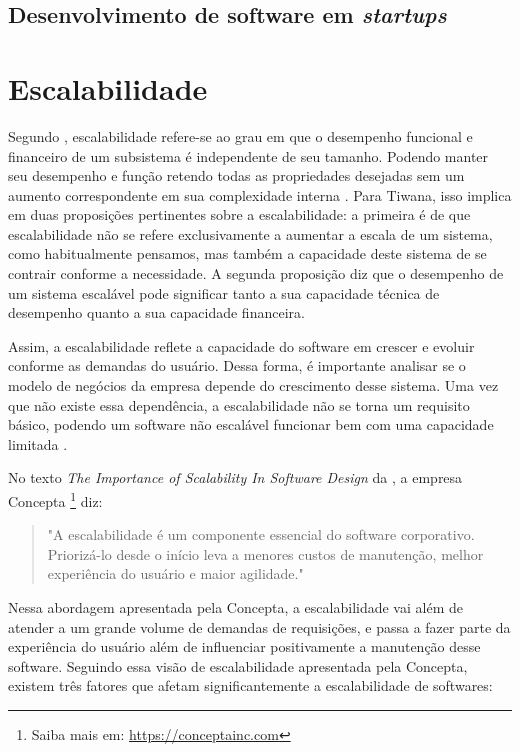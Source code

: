 \subsection{Desenvolvimento de software em \textit{startups}}

\section{Escalabilidade}

Segundo , escalabilidade refere-se ao grau em que
o desempenho funcional e financeiro de um subsistema é independente de seu tamanho.
Podendo manter seu desempenho e função retendo todas as propriedades desejadas sem
um aumento correspondente em sua complexidade interna
. Para Tiwana, isso implica em duas
proposições pertinentes sobre a escalabilidade: a primeira é de que escalabilidade não
se refere exclusivamente a aumentar a escala de um sistema, como habitualmente
pensamos, mas também a capacidade deste sistema de se contrair conforme a necessidade.
A segunda proposição diz que o desempenho de um sistema escalável pode significar
tanto a sua capacidade técnica de desempenho quanto a sua capacidade financeira.

Assim, a escalabilidade reflete a capacidade do software em crescer e evoluir
conforme as demandas do usuário. Dessa forma, é importante analisar se o
modelo de negócios da empresa depende do crescimento desse sistema. Uma vez que
não existe essa dependência, a escalabilidade não se torna um requisito básico,
podendo um software não escalável funcionar bem com uma capacidade limitada
\cite{ConceptaScalability}.

No texto \textit{The Importance of Scalability In Software Design}
da , a empresa Concepta
\footnote{Saiba mais em: \url{https://conceptainc.com}} diz:

  \begin{quotation}
    "A escalabilidade é um componente essencial do software corporativo. Priorizá-lo
    desde o início leva a menores custos de manutenção, melhor experiência do usuário
    e maior agilidade."
  \end{quotation}

Nessa abordagem apresentada pela Concepta, a escalabilidade vai além de atender
a um grande volume de demandas de requisições, e passa a fazer parte da
experiência do usuário além de influenciar positivamente a manutenção desse
software. Seguindo essa visão de escalabilidade apresentada pela Concepta,
existem três fatores que afetam significantemente a escalabilidade de softwares:

